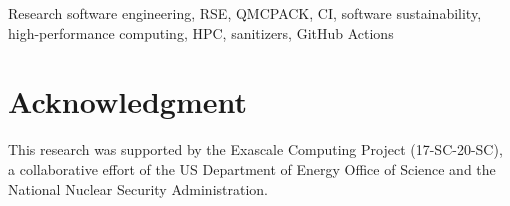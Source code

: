 \documentclass[conference]{IEEEtran}
\begin{document}
\begin{IEEEkeywords}
Research software engineering, RSE, QMCPACK, CI, software sustainability, high-performance computing, HPC, sanitizers, GitHub Actions
\end{IEEEkeywords}










\section*{Acknowledgment}
This research was supported by the Exascale Computing Project (17-SC-20-SC), a collaborative effort of the US Department of Energy Office of Science and the National Nuclear Security Administration.




\appendices


%
\end{document}
